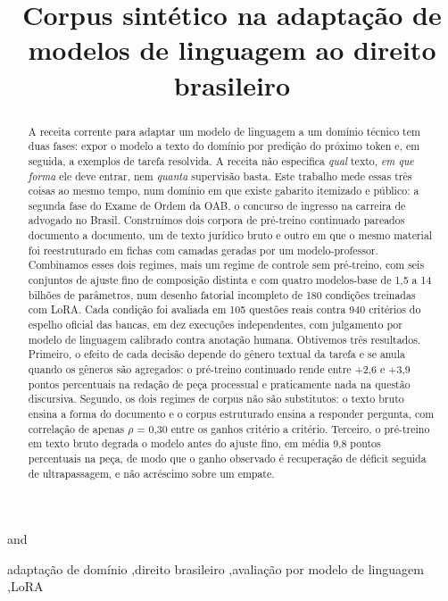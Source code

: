 \documentclass{IOS-Book-Article}
\begin{document}
\begin{frontmatter}
\title{Corpus sintético na adaptação de modelos de linguagem ao direito brasileiro}
\author[A]{ }
and
\author[A]{ }
\address[A]{Instituto de Ciências Matemáticas e de Computação, Universidade de São Paulo}
\begin{abstract}
A receita corrente para adaptar um modelo de linguagem a um domínio técnico tem duas fases: expor o modelo a texto do domínio por predição do próximo token e, em seguida, a exemplos de tarefa resolvida. A receita não especifica \emph{qual} texto, \emph{em que forma} ele deve entrar, nem \emph{quanta} supervisão basta. Este trabalho mede essas três coisas ao mesmo tempo, num domínio em que existe gabarito itemizado e público: a segunda fase do Exame de Ordem da OAB, o concurso de ingresso na carreira de advogado no Brasil. Construímos dois corpora de pré-treino continuado pareados documento a documento, um de texto jurídico bruto e outro em que o mesmo material foi reestruturado em fichas com camadas geradas por um modelo-professor. Combinamos esses dois regimes, mais um regime de controle sem pré-treino, com seis conjuntos de ajuste fino de composição distinta e com quatro modelos-base de 1,5 a 14 bilhões de parâmetros, num desenho fatorial incompleto de 180 condições treinadas com LoRA. Cada condição foi avaliada em 105 questões reais contra 940 critérios do espelho oficial das bancas, em dez execuções independentes, com julgamento por modelo de linguagem calibrado contra anotação humana. Obtivemos três resultados. Primeiro, o efeito de cada decisão depende do gênero textual da tarefa e se anula quando os gêneros são agregados: o pré-treino continuado rende entre +2,6 e +3,9 pontos percentuais na redação de peça processual e praticamente nada na questão discursiva. Segundo, os dois regimes de corpus não são substitutos: o texto bruto ensina a forma do documento e o corpus estruturado ensina a responder pergunta, com correlação de apenas $\rho$ = 0,30 entre os ganhos critério a critério. Terceiro, o pré-treino em texto bruto degrada o modelo antes do ajuste fino, em média 9,8 pontos percentuais na peça, de modo que o ganho observado é recuperação de déficit seguida de ultrapassagem, e não acréscimo sobre um empate.
\end{abstract}
\begin{keyword}
adaptação de domínio \sep direito brasileiro \sep avaliação por modelo de linguagem \sep LoRA
\end{keyword}
\end{frontmatter}
\end{document}
